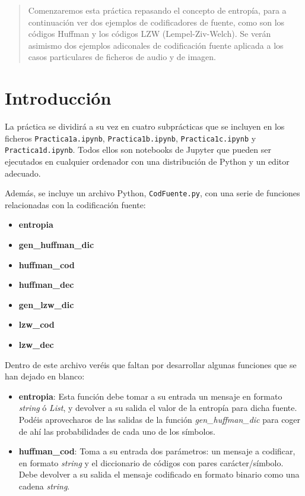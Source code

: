\documentclass[es,practica]{uah}
\begin{document}

\maketitle

\begin{abstract}
Comenzaremos esta práctica repasando el concepto de entropía, para a continuación ver dos ejemplos de codificadores de fuente, como son los códigos Huffman y los códigos LZW (Lempel-Ziv-Welch). Se verán asimismo dos ejemplos adiconales de codificación fuente aplicada a los casos particulares de ficheros de audio y de imagen. 
\end{abstract}

\section{Introducción}

La práctica se dividirá a su vez en cuatro subprácticas que se incluyen en los ficheros \texttt{Practica1a.ipynb}, \texttt{Practica1b.ipynb}, \texttt{Practica1c.ipynb} y \texttt{Practica1d.ipynb}. Todos ellos son notebooks de Jupyter que pueden ser ejecutados en cualquier ordenador con una distribución de Python y un editor adecuado. 

Además, se incluye un archivo Python, \texttt{CodFuente.py}, con una serie de funciones relacionadas con la codificación fuente:
\begin{itemize}
	\item {\bf entropia}
	\item {\bf gen\_huffman\_dic}
	\item {\bf huffman\_cod}
	\item {\bf huffman\_dec}
	\item {\bf gen\_lzw\_dic}
	\item {\bf lzw\_cod}
	\item {\bf lzw\_dec}
\end{itemize}


Dentro de este archivo veréis que faltan por desarrollar algunas funciones que se han dejado en blanco:
\begin{itemize}
	\item {\bf entropia}: Esta función debe tomar a su entrada un mensaje en formato \emph{string} ó \emph{List}, y devolver a su salida el valor de la entropía para dicha fuente. Podéis aprovecharos de las salidas de la función \emph{gen\_huffman\_dic} para coger de ahí las probabilidades de cada uno de los símbolos.
	\item {\bf huffman\_cod}: Toma a su entrada dos parámetros: un mensaje a codificar, en formato \emph{string} y el diccionario de códigos con pares carácter/símbolo. Debe devolver a su salida el mensaje codificado en formato binario como una cadena \emph{string}.
\end{itemize}
\end{document}
